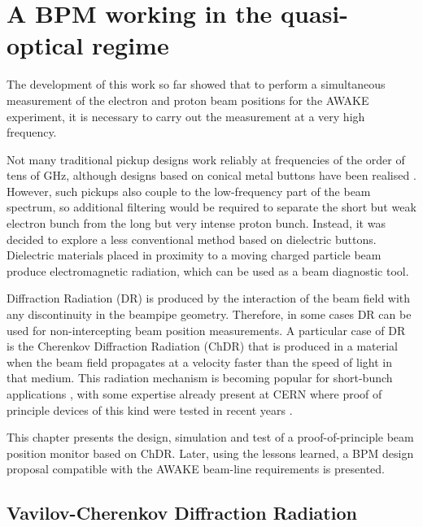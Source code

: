 \chapter[A BPM working in the quasi-optical regime]{A BPM working in the quasi-optical regime}\label{chapter:CLEAR_test}

The development of this work so far showed that to perform a simultaneous measurement of the electron and proton beam positions for the AWAKE experiment, it is necessary to carry out the measurement at a very high frequency. 

Not many traditional pickup designs work reliably at frequencies of the order of tens of GHz, although designs based on conical metal buttons have been realised  \cite{PhysRevSTAB.15.112803}. However, such pickups also couple to the low-frequency part of the beam spectrum, so additional filtering would be required to separate the short but weak electron bunch from the long but very intense proton bunch. Instead, it was decided to explore a less conventional method based on dielectric buttons. Dielectric materials placed in proximity to a moving charged particle beam produce electromagnetic radiation, which can be used as a beam diagnostic tool. 

Diffraction Radiation (DR) is produced by the interaction of the beam field with any discontinuity in the beampipe geometry. Therefore, in some cases DR can be used for non-intercepting beam position measurements. A particular case of DR is the Cherenkov Diffraction Radiation (ChDR) that is produced in a material when the beam field propagates at a velocity faster than the speed of light in that medium. This radiation mechanism is becoming popular for short-bunch applications \cite{ch_dr_ibic19}, with some expertise already present at CERN where proof of principle devices of this kind were tested in recent years \cite{PhysRevAccelBeams.23.022802}. 

This chapter presents the design, simulation and test of a proof-of-principle beam position monitor based on ChDR. Later, using the lessons learned, a BPM design proposal compatible with the AWAKE beam-line requirements is presented.








\section[Vavilov-Cherenkov Diffraction Radiation]{Vavilov-Cherenkov Diffraction Radiation}\label{sec:vch_theory}

